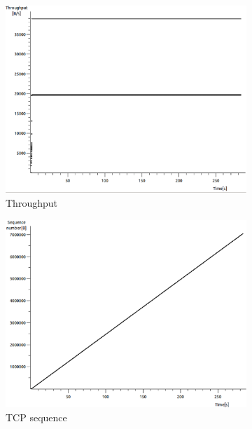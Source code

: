 \documentclass[conference,a4paper]{IEEEtran}
\begin{document}
\begin{figure}
 \centering
 \begin{subfigure}[b]{0.2\textwidth}
  \includegraphics[width=\textwidth]{s4-1_thru}
  \caption{Throughput}
 \end{subfigure}
 \begin{subfigure}[b]{0.2\textwidth}
  \includegraphics[width=\textwidth]{s4-1_seq}
  \caption{TCP sequence}
 \end{subfigure}
 \begin{subfigure}[b]{0.2\textwidth}

\end{subfigure}
\end{figure}
\end{document}
